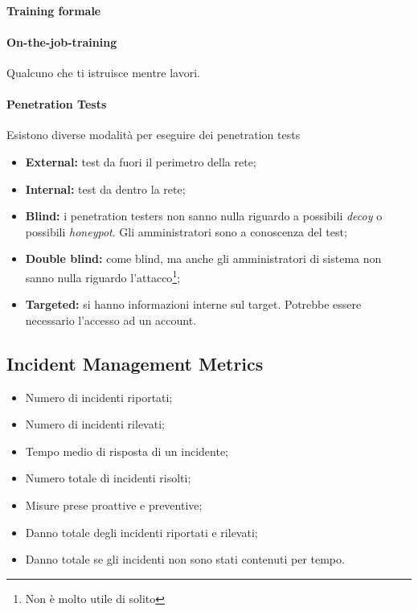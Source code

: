 \paragraph*{Training formale}

\paragraph*{On-the-job-training} Qualcuno che ti istruisce mentre lavori.


\paragraph*{Penetration Tests} Esistono diverse modalità per eseguire dei
penetration tests
\begin{itemize}
\item \textbf{External:} test da fuori il perimetro della rete;
\item \textbf{Internal:} test da dentro la rete;
\item \textbf{Blind:} i penetration testers non sanno nulla riguardo a possibili
\textit{decoy} o possibili \textit{honeypot}. Gli amministratori sono a
conoscenza del test;
\item \textbf{Double blind:} come blind, ma anche gli amministratori di sistema non sanno
nulla riguardo l'attacco\footnote{Non è molto utile di solito};
\item \textbf{Targeted:} si hanno informazioni interne sul target. Potrebbe essere
necessario l'accesso ad un account.
\end{itemize}

\subsection{Incident Management Metrics}

\begin{itemize}
\item Numero di incidenti riportati;
\item Numero di incidenti rilevati;
\item Tempo medio di risposta di un incidente;
\item Numero totale di incidenti risolti;
\item Misure prese proattive e preventive;
\item Danno totale degli incidenti riportati e rilevati;
\item Danno totale se gli incidenti non sono stati contenuti per tempo.
\end{itemize}

